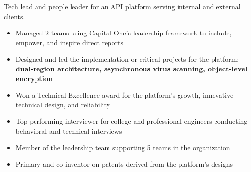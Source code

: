 \documentclass[10pt,a4paper,ragged2e,withhyper]{altacv}
\begin{document}

\makecvheader



\begin{paracol}{2}


Tech lead and people leader for an API platform serving internal and external clients.
\begin{itemize}
\item Managed 2 teams using Capital One's leadership framework to include, empower, and inspire direct reports
\item Designed and led the implementation or critical projects for the platform: \textbf{dual-region architecture, asynchronous virus scanning, object-level encryption}
\item Won a Technical Excellence award for the platform's growth, innovative technical design, and reliability
\item Top performing interviewer for college and professional engineers conducting behavioral and technical interviews
\item Member of the leadership team supporting 5 teams in the organization
\item Primary and co-inventor on patents derived from the platform's designs
\end{itemize}


\divider{}


\end{paracol}
\end{document}
